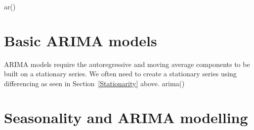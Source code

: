 ar() 
 
\section{Basic ARIMA models} 
 
ARIMA models require the autoregressive and moving average components to be built on a stationary series. We often need to create a stationary series using differencing as seen in Section~\ref{Stationarity} above. 
arima() 
 
\section{Seasonality and ARIMA modelling} 
 


